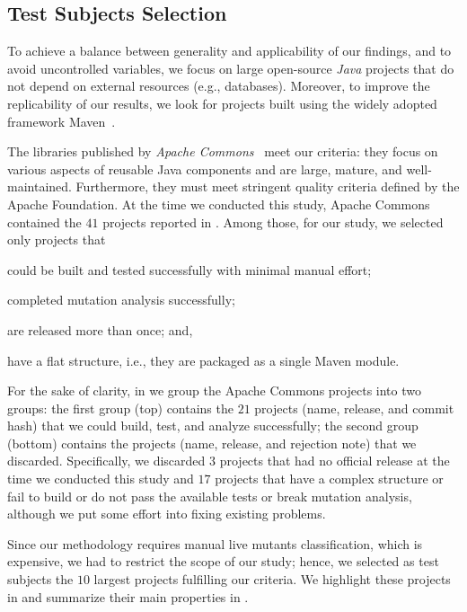\documentclass[sigconf,review,anonymous]{acmart}
\begin{document}
\subsection{Test Subjects Selection}
\label{sec:selection}
To achieve a balance between generality and applicability of
our findings, and to avoid uncontrolled variables,
we focus on large open-source \emph{Java} projects that do
not depend on %
external resources (e.g., databases). %
Moreover, to improve the replicability of our results, 
we look for projects built using the %
 widely adopted framework Maven~\cite{maven}.

The libraries published by \emph{Apache Commons}~\cite{commons} meet our criteria:
they focus on various aspects of reusable Java components and
are large, mature, and well-maintained.
Furthermore, they must meet stringent
quality criteria defined by the Apache Foundation.
%
At the time we conducted this study,
Apache Commons contained the $41$ projects
reported in .
%
Among those, for our study, we selected only projects that
\begin{enumerate*}[label=(\arabic*)]
  \item could be built and tested successfully with minimal manual effort;
  \item completed mutation analysis successfully;
  \item are released more than once; and,
  \item have a flat structure, i.e., they are packaged as a single Maven module.
\end{enumerate*}

For the sake of clarity, in  we group the
Apache Commons projects into two groups:
the first group (top) contains the $21$ projects (name, release, and commit hash)
that we could build, test, and analyze successfully;
the second group (bottom) contains the projects (name, release, and rejection note) that we discarded.
%
Specifically, we discarded $3$ projects that had no official release at the time we conducted this study and 
$17$ projects that have a complex structure or fail to build or do not pass the available tests or break mutation analysis, although we put some effort into fixing existing problems.

Since our methodology requires manual live mutants classification, which is %
expensive, we had to restrict the scope of our study; hence, we selected 
as test subjects the $10$ largest projects fulfilling our criteria.
%
We highlight these projects in  and
summarize their main properties in .
\end{document}
